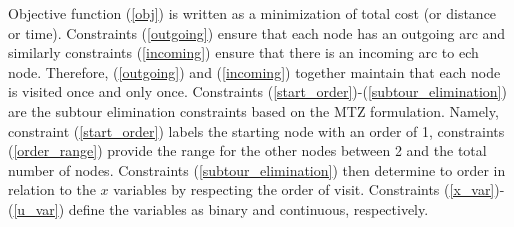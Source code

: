 \documentclass[11pt,a4paper]{article}
\begin{document}
Objective function (\ref{obj}) is written as a minimization of total cost (or distance or time). Constraints (\ref{outgoing}) ensure that each node has an outgoing arc and similarly constraints (\ref{incoming}) ensure that there is an incoming arc to ech node. Therefore, (\ref{outgoing}) and (\ref{incoming}) together maintain that each node is visited once and only once.   
Constraints (\ref{start_order})-(\ref{subtour_elimination}) are the subtour elimination constraints based on the MTZ formulation. Namely, constraint (\ref{start_order}) labels the starting node with an order of 1, constraints (\ref{order_range}) provide the range for the other nodes between 2 and the total number of nodes. Constraints (\ref{subtour_elimination}) then determine to order in relation to the $x$ variables by respecting the order of visit. Constraints (\ref{x_var})-(\ref{u_var}) define the variables as binary and continuous, respectively. 


       
\end{document}
